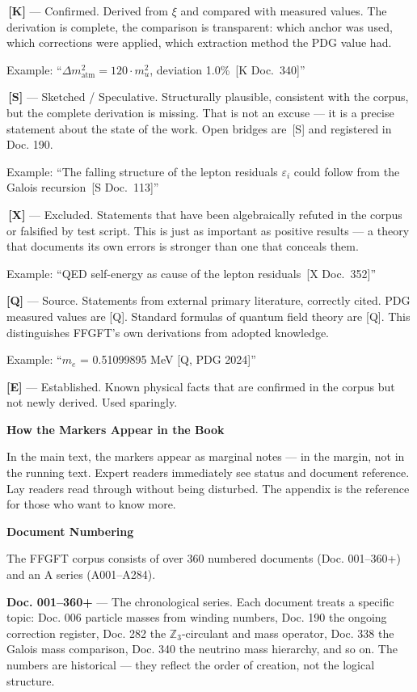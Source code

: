 \documentclass[11pt,oneside]{book}
\newcommand{\status}[1]{\penalty10000\,{\scriptsize\textcolor{gray!60}{[#1]}}}
\begin{document}
\textbf{\status{K}} — Confirmed. Derived from $\xi$ and compared with measured
values. The derivation is complete, the comparison is transparent: which
anchor was used, which corrections were applied, which extraction method
the PDG value had.

Example: \enquote{$\Delta m^2_\text{atm} = 120\cdot m_
u^2$, deviation 1.0\% \status{K Doc.~340}}

\textbf{\status{S}} — Sketched / Speculative. Structurally plausible, consistent
with the corpus, but the complete derivation is missing. That is not an
excuse — it is a precise statement about the state of the work. Open bridges
are \status{S} and registered in Doc. 190.

Example: \enquote{The falling structure of the lepton residuals $\varepsilon_i$ could
follow from the Galois recursion \status{S Doc.~113}}

\textbf{\status{X}} — Excluded. Statements that have been algebraically refuted
in the corpus or falsified by test script. This is just as important as
positive results — a theory that documents its own errors is stronger than
one that conceals them.

Example: \enquote{QED self-energy as cause of the lepton residuals \status{X Doc.~352}}

\textbf{[Q]} — Source. Statements from external primary literature, correctly
cited. PDG measured values are [Q]. Standard formulas of quantum field
theory are [Q]. This distinguishes FFGFT's own derivations from adopted
knowledge.

Example: \enquote{$m_e$ = 0.51099895 MeV [Q, PDG 2024]}

\textbf{[E]} — Established. Known physical facts that are confirmed in the
corpus but not newly derived. Used sparingly.

\textbf{How the Markers Appear in the Book}

In the main text, the markers appear as marginal notes — in the margin, not
in the running text. Expert readers immediately see status and document
reference. Lay readers read through without being disturbed. The appendix is
the reference for those who want to know more.


\textbf{Document Numbering}

The FFGFT corpus consists of over 360 numbered documents (Doc. 001–360+) and
an A series (A001–A284).

\textbf{Doc. 001–360+} — The chronological series. Each document treats a
specific topic: Doc. 006 particle masses from winding numbers, Doc. 190 the
ongoing correction register, Doc. 282 the $\mathbb{Z}_3$-circulant and mass
operator, Doc. 338 the Galois mass comparison, Doc. 340 the neutrino mass
hierarchy, and so on. The numbers are historical — they reflect the order of
creation, not the logical structure.
\end{document}
